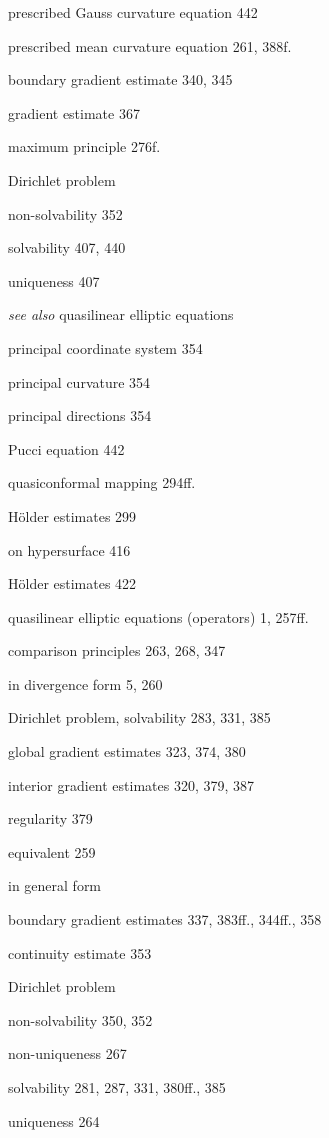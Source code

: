 prescribed Gauss curvature equation 442

prescribed mean curvature equation 261, 388f.

\quad boundary gradient estimate 340, 345

\quad gradient estimate 367

\quad maximum principle 276f.

Dirichlet problem

\quad non-solvability 352

\quad solvability 407, 440

\quad uniqueness 407

\emph{see also} quasilinear elliptic equations

principal coordinate system 354

principal curvature 354

principal directions 354

Pucci equation 442

\vspace{1em}

quasiconformal mapping 294ff.

\quad H\"older estimates 299

\quad on hypersurface 416

\quad H\"older estimates 422

quasilinear elliptic equations (operators) 1, 257ff.

\quad comparison principles 263, 268, 347

\quad in divergence form 5, 260

\qquad Dirichlet problem, solvability 283, 331, 385

\qquad global gradient estimates 323, 374, 380

\qquad interior gradient estimates 320, 379, 387

\quad regularity 379

\quad equivalent 259

\quad in general form

\qquad boundary gradient estimates 337, 383ff., 344ff., 358

\qquad continuity estimate 353

\qquad Dirichlet problem

\qquad\quad non-solvability 350, 352

\qquad\quad non-uniqueness 267

\qquad\quad solvability 281, 287, 331, 380ff., 385

\qquad\quad uniqueness 264

